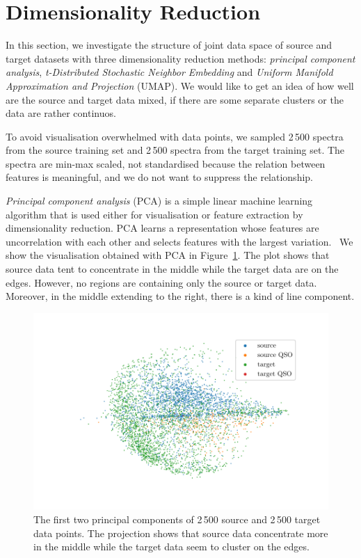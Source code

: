 \section{Dimensionality Reduction}

In this section, we investigate the structure of joint data space of source and target datasets with three dimensionality reduction methods:
\textit{principal component analysis},
\textit{t-Distributed Stochastic Neighbor Embedding}
and \textit{Uniform Manifold Approximation and Projection} (UMAP).
We would like to get an idea of how well are the source and target data mixed,
if there are some separate clusters or the data are rather continuos.

To avoid visualisation overwhelmed with data points,
we sampled 2\,500 spectra from the source training set
and 2\,500 spectra from the target training set.
The spectra are min-max scaled, not standardised
because the relation between features is meaningful,
and we do not want to suppress the relationship.

\textit{Principal component analysis} (PCA) is a simple linear machine learning algorithm
that is used either for visualisation or feature extraction by dimensionality reduction.
PCA learns a representation whose features are uncorrelation with each other
and selects features with the largest variation.~\cite{goodfellow2016}
We show the visualisation obtained with PCA in Figure~\ref{pca}.
The plot shows that source data tent to concentrate in the middle
while the target data are on the edges.
However, no regions are containing only the source or target data.
Moreover, in the middle extending to the right, there is a kind of line component.

\begin{figure}
\includegraphics[width=\textwidth]{img/pca.pdf}
\caption[PCA visualisation of source and target data distributions]{
	The first two principal components of 2\,500 source
	and 2\,500 target data points.
	The projection shows that source data concentrate more in the middle
	while the target data seem to cluster on the edges.
	}
\label{pca}
\end{figure}

